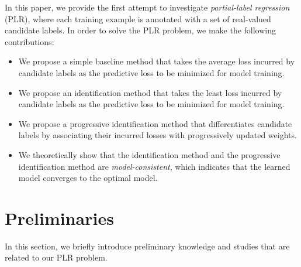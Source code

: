 \documentclass[letterpaper]{article} %
\begin{document}
In this paper, we provide the first attempt to investigate \emph{partial-label regression} (PLR), where each training example is annotated with a set of real-valued candidate labels. In order to solve the PLR problem, we make the following contributions:
\begin{itemize}
\item We propose a simple baseline method that takes the average loss incurred by candidate labels as the predictive loss to be minimized for model training.
\item We propose an identification method that takes the least loss incurred by candidate labels as the predictive loss to be minimized for model training. 
\item We propose a progressive identification method that differentiates candidate labels by associating their incurred losses with progressively updated weights.
\item We theoretically show that the identification method and the progressive identification method are \emph{model-consistent}, which indicates that the learned model converges to the optimal model.
\end{itemize}
\section{Preliminaries}
In this section, we briefly introduce preliminary knowledge and studies that are related to our PLR problem.
\end{document}
